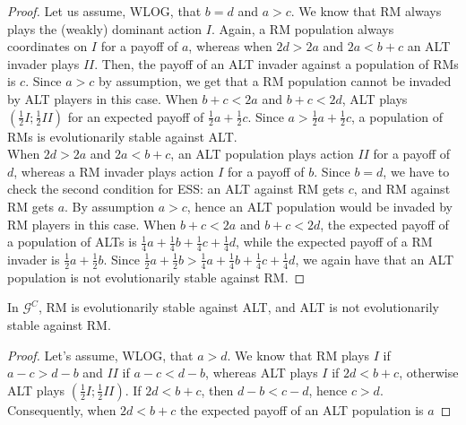 \documentclass[fleqn,reqno,11pt]{article}
\begin{document}
\begin{proof}
Let us assume, WLOG, that $b=d$ and $a>c$. We know that RM always plays the (weakly) dominant action $I$. Again, a RM population always coordinates on $I$ for a payoff of $a$, whereas when $2d > 2a$ and $2a < b+c$ an ALT invader plays $II$. Then, the payoff of an ALT invader against a population of RMs is $c$. Since $a>c$ by assumption, we get that a RM population cannot be invaded by ALT players in this case. When $b+c < 2a$ and $b+c < 2d$, ALT plays $(\frac{1}{2}I;\frac{1}{2}II)$ for an expected payoff of $\frac{1}{2} a + \frac{1}{2} c$. Since $a > \frac{1}{2} a + \frac{1}{2} c$, a population of RMs is evolutionarily stable against ALT. \\
When $2d > 2a$ and $2a < b+c$, an ALT population plays action $II$ for a payoff of $d$, whereas a RM invader plays action $I$ for a payoff of $b$. Since $b=d$, we have to check the second condition for ESS: an ALT against RM gets $c$, and RM against RM gets $a$. By assumption $a>c$, hence an ALT population would be invaded by RM players in this case. 
When $b+c < 2a$ and $b+c < 2d$, the expected payoff of a population of ALTs is $\frac{1}{4}a+\frac{1}{4}b+\frac{1}{4}c+\frac{1}{4}d$, while the expected payoff of a RM invader is $\frac{1}{2}a+\frac{1}{2}b$. Since $\frac{1}{2}a+\frac{1}{2}b > \frac{1}{4}a+\frac{1}{4}b+\frac{1}{4}c+\frac{1}{4}d$, we again have that an ALT population is not evolutionarily stable against RM.
\end{proof}

\begin{lemma}
In $\mathcal{G}^C$, RM is evolutionarily stable against ALT, and ALT is not evolutionarily stable against RM. 
\end{lemma}

\begin{proof}
Let's assume, WLOG, that $a>d$. We know that RM plays $I$ if $ a-c > d-b $ and $II$ if $ a-c < d-b $, whereas  ALT plays $I$ if $2d<b+c$, otherwise ALT plays $(\frac{1}{2}I;\frac{1}{2}II)$. If $2d<b+c$, then $d-b<c-d$, hence $c>d$. Consequently, when $2d<b+c$ the expected payoff of an ALT population is $a$
\end{proof}

\fi
\end{document}
